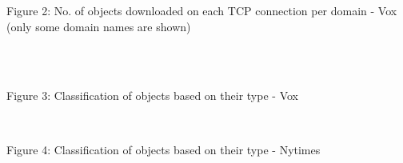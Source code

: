 \documentclass[12pt]{article}
\begin{document}
\vspace*{-0.6cm}
\begin{center}Figure 2: No. of objects downloaded on each TCP connection per domain - Vox (only some domain names are shown)\end{center}
~\\\\
{
\begin{center}Figure 3: Classification of objects based on their type - Vox\end{center}
}
~
{
\vspace*{-0.6cm}
\begin{center}Figure 4: Classification of objects based on their type - Nytimes\end{center}
}
\end{document}

